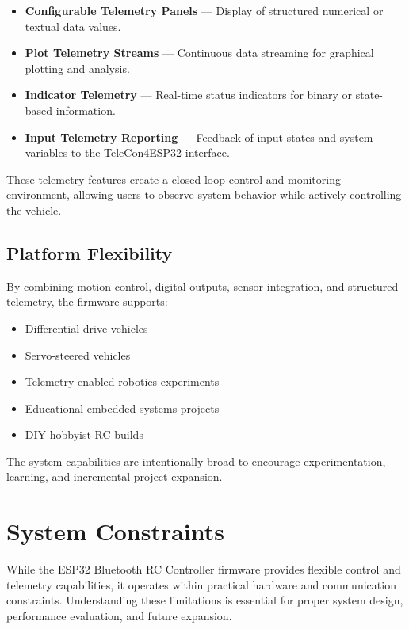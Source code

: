\begin{itemize}
	\item \textbf{Configurable Telemetry Panels} — Display of structured numerical or textual data values.
	
	\item \textbf{Plot Telemetry Streams} — Continuous data streaming for graphical plotting and analysis.
	
	\item \textbf{Indicator Telemetry} — Real-time status indicators for binary or state-based information.
	
	\item \textbf{Input Telemetry Reporting} — Feedback of input states and system variables to the TeleCon4ESP32 interface.
\end{itemize}

These telemetry features create a closed-loop control and monitoring environment, allowing users to observe system behavior while actively controlling the vehicle.

\subsection{Platform Flexibility}

By combining motion control, digital outputs, sensor integration, and structured telemetry, the firmware supports:

\begin{itemize}
	\item Differential drive vehicles
	\item Servo-steered vehicles
	\item Telemetry-enabled robotics experiments
	\item Educational embedded systems projects
	\item DIY hobbyist RC builds
\end{itemize}

The system capabilities are intentionally broad to encourage experimentation, learning, and incremental project expansion.




\section{System Constraints}

While the ESP32 Bluetooth RC Controller firmware provides flexible control and telemetry capabilities, it operates within practical hardware and communication constraints. Understanding these limitations is essential for proper system design, performance evaluation, and future expansion.

